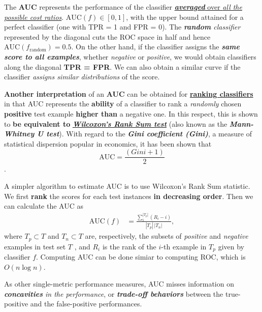 \documentclass[11pt]{article}
\begin{document}
The \textbf{AUC} represents the performance of the classifier \underline{\emph{\textbf{averaged}} over \emph{all the possible cost ratios}}. $\text{AUC}(f) \in [0,1]$,  with the upper bound attained for a perfect classifier (one with TPR = 1 and FPR = 0).  The \emph{\textbf{random} classifier} represented by the diagonal cuts the ROC space in half and hence $\text{AUC}(f_{\text{random}}) = 0.5$. On the other hand, if the classifier assigns the \emph{\textbf{same score to all examples}}, whether \emph{negative} or \emph{positive}, we would obtain classifiers along the diagonal \textbf{TPR = FPR}. We can also obtain a similar curve if the classifier \emph{assigns similar distributions} of the score. 

\textbf{Another interpretation} of an \textbf{AUC} can be obtained for \underline{\textbf{ranking classifiers}} in that AUC represents the \textbf{ability} of a classifier to rank a \emph{randomly} chosen \textbf{positive} test example \textbf{higher than} a negative one. In this respect, this is shown to \textbf{be equivalent to} \underline{\textbf{\emph{Wilcoxon's Rank Sum test}}} (also known as the \emph{\textbf{Mann-Whitney U test}}).  With regard to the \emph{\textbf{Gini
coefficient (Gini)}}, a measure of statistical dispersion popular in economics, it has been shown that $$\text{AUC} = \frac{(Gini + 1)}{2}$$.

A simpler algorithm to estimate AUC is to use Wilcoxon’s Rank Sum statistic. We first \textbf{rank} the scores for each test instances \textbf{in decreasing order}. Then we can calculate the AUC as
\begin{align}
\text{AUC}(f) &= \frac{\sum_{i}^{|T_{p}|}(R_i - i)}{|T_{p}|\, |T_{n}|},  \label{eqn: auc_compute_wilcoxon}
\end{align} where $T_{p} \subset  T$  and $T_n \subset T$ are, respectively, the subsets of \emph{positive} and \emph{negative} examples in test set $T$ , and $R_i$ is the rank of the $i$-th example in $T_p$ given by classifier $f$. Computing AUC can be done simiar to computing ROC, which is $O(n \log n)$. 

As other single-metric performance measures, AUC misses  information on \emph{\textbf{concavities} in the performance}, or \textit{\textbf{trade-off behaviors}} between the true-positive and the false-positive performances. 
\end{document}
